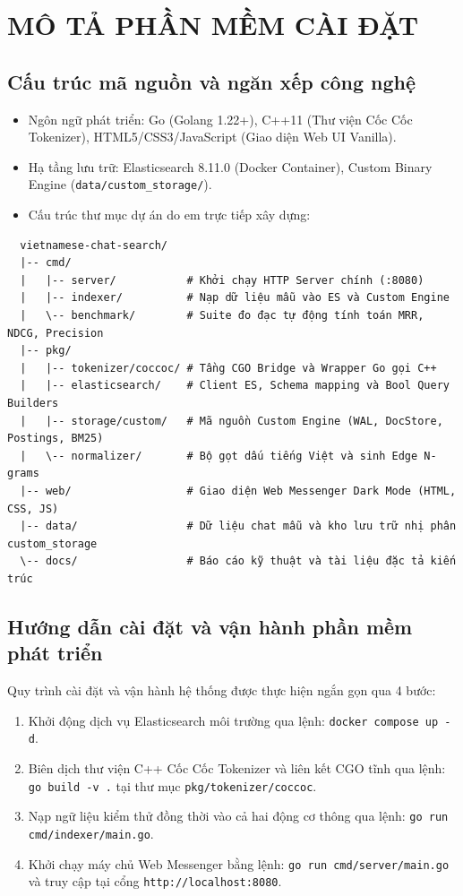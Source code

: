 \documentclass[12pt,a4paper,oneside]{report}
\begin{document}
\chapter{MÔ TẢ PHẦN MỀM CÀI ĐẶT}

\section{Cấu trúc mã nguồn và ngăn xếp công nghệ}
\begin{itemize}
    \item Ngôn ngữ phát triển: Go (Golang 1.22+), C++11 (Thư viện Cốc Cốc Tokenizer), HTML5/CSS3/JavaScript (Giao diện Web UI Vanilla).
    \item Hạ tầng lưu trữ: Elasticsearch 8.11.0 (Docker Container), Custom Binary Engine (\texttt{data/custom\_storage/}).
    \item Cấu trúc thư mục dự án do em trực tiếp xây dựng:
\end{itemize}

\begin{verbatim}
  vietnamese-chat-search/
  |-- cmd/
  |   |-- server/           # Khởi chạy HTTP Server chính (:8080)
  |   |-- indexer/          # Nạp dữ liệu mẫu vào ES và Custom Engine
  |   \-- benchmark/        # Suite đo đạc tự động tính toán MRR, NDCG, Precision
  |-- pkg/
  |   |-- tokenizer/coccoc/ # Tầng CGO Bridge và Wrapper Go gọi C++
  |   |-- elasticsearch/    # Client ES, Schema mapping và Bool Query Builders
  |   |-- storage/custom/   # Mã nguồn Custom Engine (WAL, DocStore, Postings, BM25)
  |   \-- normalizer/       # Bộ gọt dấu tiếng Việt và sinh Edge N-grams
  |-- web/                  # Giao diện Web Messenger Dark Mode (HTML, CSS, JS)
  |-- data/                 # Dữ liệu chat mẫu và kho lưu trữ nhị phân custom_storage
  \-- docs/                 # Báo cáo kỹ thuật và tài liệu đặc tả kiến trúc
\end{verbatim}

\section{Hướng dẫn cài đặt và vận hành phần mềm phát triển}
Quy trình cài đặt và vận hành hệ thống được thực hiện ngắn gọn qua 4 bước:
\begin{enumerate}
    \item Khởi động dịch vụ Elasticsearch môi trường qua lệnh: \texttt{docker compose up -d}.
    \item Biên dịch thư viện C++ Cốc Cốc Tokenizer và liên kết CGO tĩnh qua lệnh: \texttt{go build -v .} tại thư mục \texttt{pkg/tokenizer/coccoc}.
    \item Nạp ngữ liệu kiểm thử đồng thời vào cả hai động cơ thông qua lệnh: \texttt{go run cmd/indexer/main.go}.
    \item Khởi chạy máy chủ Web Messenger bằng lệnh: \texttt{go run cmd/server/main.go} và truy cập tại cổng \texttt{http://localhost:8080}.
\end{enumerate}
\end{document}
